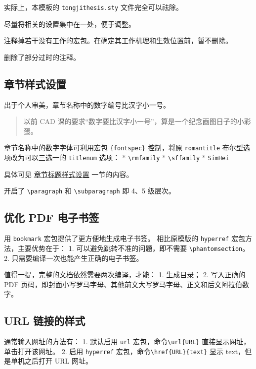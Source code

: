 \documentclass[../Main/thesis.tex]{subfiles}
\begin{document}
实际上，本模板的 \texttt{tongjithesis.sty} 文件完全可以祛除。

尽量将相关的设置集中在一处，便于调整。

注释掉若干没有工作的宏包。在确定其工作机理和生效位置前，暂不删除。

删除了部分过时的注释。

\subsection{章节样式设置}

出于个人审美，章节名称中的数字编号比汉字小一号。

\begin{quote}
以前 CAD 课的要求``数字要比汉字小一号''，算是一个纪念画图日子的小彩蛋。
\end{quote}

章节名称中的数字字体可利用宏包 \texttt{\{fontspec\}} 控制，将原
\texttt{romantitle} 布尔型选项改为可以三选一的 \texttt{titlenum} 选项：
* \texttt{\textbackslash{}rmfamily} * \texttt{\textbackslash{}sffamily}
* \texttt{SimHei}

具体可见
\protect\hyperlink{ux5cux25E7ux5cux25ABux5cux25A0ux5cux25E8ux5cux258Aux5cux2582ux5cux25E6ux5cux25A0ux5cux2587ux5cux25E9ux5cux25A2ux5cux2598ux5cux25E6ux5cux25A0ux5cux25B7ux5cux25E5ux5cux25BCux5cux258Fux5cux25E8ux5cux25AEux5cux25BEux5cux25E7ux5cux25BDux5cux25AE}{章节标题样式设置}
一节的内容。

开启了 \texttt{\textbackslash{}paragraph} 和
\texttt{\textbackslash{}subparagraph} 即 4、5 级层次。

\subsection{优化 PDF 电子书签}

用 \texttt{bookmark} 宏包提供了更方便地生成电子书签。 相比原模版的
\texttt{hyperref} 宏包方法，主要优势在于： 1.
可以避免跳转不准的问题，即不需要
\texttt{\textbackslash{}phantomsection}。 2.
只需要编译一次也能产生正确的电子书签。

值得一提，完整的文档依然需要两次编译，才能： 1. 生成目录； 2. 写入正确的
PDF
页码，即封面小写罗马字母、其他前文大写罗马字母、正文和后文阿拉伯数字。

\subsection{URL 链接的样式}

通常输入网址的方法有： 1. 默认启用 \texttt{url}
宏包，命令\texttt{\textbackslash{}url\{URL\}}
直接显示网址，单击打开该网址。 2. 启用 \texttt{hyperref}
宏包，命令\texttt{\textbackslash{}href\{URL\}\{text\}} 显示
text，但是单机之后打开 URL 网址。
\end{document}
